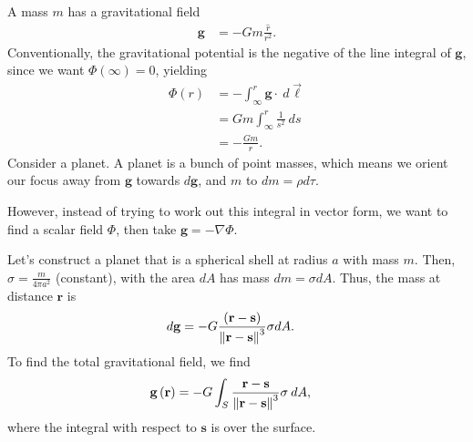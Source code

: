 \documentclass[10pt]{mypackage}
\begin{document}
\begin{example}[Gravity]
  A mass $m$ has a gravitational field
  \begin{align*}
    \mathbf{g} &= -Gm\frac{\hat{r}}{r^2}.
  \end{align*}
  Conventionally, the gravitational potential is the negative of the line integral of $\mathbf{g}$, since we want $\Phi\left(\infty\right) = 0$, yielding
  \begin{align*}
    \Phi\left(r\right) &= -\int_{\infty}^{r} \mathbf{g}\cdot\:d\vec{\ell}\\
                       &= Gm\int_{\infty}^{r} \frac{1}{s^2}\:ds\\
                       &= -\frac{Gm}{r}.
  \end{align*}
  Consider a planet. A planet is a bunch of point masses, which means we orient our focus away from $\mathbf{g}$ towards $d\mathbf{g}$, and $m$ to $dm = \rho d\tau$.\newline

  However, instead of trying to work out this integral in vector form, we want to find a scalar field $\Phi$, then take $\mathbf{g} = -\nabla \Phi$.\newline

  Let's construct a planet that is a spherical shell at radius $a$ with mass $m$. Then, $\sigma = \frac{m}{4\pi a^2}$ (constant), with the area $dA$ has mass $dm = \sigma dA$. Thus, the mass at distance $\mathbf{r}$ is
  \begin{align*}
    d\mathbf{g} &= -G\frac{\left(\mathbf{r} - \mathbf{s}\right)}{\norm{\mathbf{r} - \mathbf{s}}^3} \sigma dA.
  \end{align*}
  To find the total gravitational field, we find
  \begin{align*}
    \mathbf{g}\left(\mathbf{r}\right) &= -G\int_{S}^{} \frac{\mathbf{r} - \mathbf{s}}{\norm{\mathbf{r} - \mathbf{s}}^3}\sigma\:dA,
  \end{align*}
  where the integral with respect to $\mathbf{s}$ is over the surface.\newline


\end{example}
\end{document}

